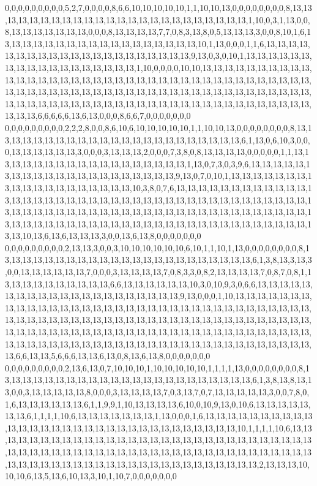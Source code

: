 0,0,0,0,0,0,0,0,0,5,2,7,0,0,0,0,8,6,6,10,10,10,10,10,1,1,10,10,13,0,0,0,0,0,0,0,0,8,13,13,13,13,13,13,13,13,13,13,13,13,13,13,13,13,13,13,13,13,13,13,13,13,1,10,0,3,1,13,0,0,8,13,13,13,13,13,13,13,0,0,0,8,13,13,13,13,7,7,0,8,3,13,8,0,5,13,13,13,3,0,0,8,10,1,6,13,13,13,13,13,13,13,13,13,13,13,13,13,13,13,13,13,13,10,1,13,0,0,0,1,1,6,13,13,13,13,13,13,13,13,13,13,13,13,13,13,13,13,13,13,13,13,13,9,13,0,3,0,10,1,13,13,13,13,13,13,13,13,13,13,13,13,13,13,13,13,13,13,1,10,0,0,0,0,10,10,13,13,13,13,13,13,13,13,13,13,13,13,13,13,13,13,13,13,13,13,13,13,13,13,13,13,13,13,13,13,13,13,13,13,13,13,13,13,13,13,13,13,13,13,13,13,13,13,13,13,13,13,13,13,13,13,13,13,13,13,13,13,13,13,13,13,13,13,13,13,13,13,13,13,13,13,13,13,13,13,13,13,13,13,13,13,13,13,13,13,13,13,13,13,13,13,13,6,6,6,6,6,13,6,13,0,0,0,8,6,6,7,0,0,0,0,0,0,0
0,0,0,0,0,0,0,0,0,2,2,2,8,0,0,8,6,10,6,10,10,10,10,10,1,1,10,10,13,0,0,0,0,0,0,0,0,8,13,13,13,13,13,13,13,13,13,13,13,13,13,13,13,13,13,13,13,13,13,13,13,6,1,13,0,6,10,3,0,0,0,13,13,13,13,13,13,3,0,0,0,3,13,13,13,2,0,0,0,7,3,8,0,8,13,13,13,13,0,0,0,0,0,1,1,13,13,13,13,13,13,13,13,13,13,13,13,13,13,13,13,13,13,1,13,0,7,3,0,3,9,6,13,13,13,13,13,13,13,13,13,13,13,13,13,13,13,13,13,13,13,13,13,9,13,0,7,0,10,1,13,13,13,13,13,13,13,13,13,13,13,13,13,13,13,13,13,13,13,10,3,8,0,7,6,13,13,13,13,13,13,13,13,13,13,13,13,13,13,13,13,13,13,13,13,13,13,13,13,13,13,13,13,13,13,13,13,13,13,13,13,13,13,13,13,13,13,13,13,13,13,13,13,13,13,13,13,13,13,13,13,13,13,13,13,13,13,13,13,13,13,13,13,13,13,13,13,13,13,13,13,13,13,13,13,13,13,13,13,13,13,13,13,13,13,13,13,13,13,13,13,13,13,10,13,6,13,6,13,13,13,3,0,0,13,6,13,8,0,0,0,0,0,0,0
0,0,0,0,0,0,0,0,0,2,13,13,3,0,0,3,10,10,10,10,10,10,6,10,1,1,10,1,13,0,0,0,0,0,0,0,0,8,13,13,13,13,13,13,13,13,13,13,13,13,13,13,13,13,13,13,13,13,13,13,13,6,1,3,8,13,3,13,3,0,0,13,13,13,13,13,13,7,0,0,0,3,13,13,13,13,7,0,8,3,3,0,8,2,13,13,13,13,7,0,8,7,0,8,1,13,13,13,13,13,13,13,13,13,13,6,6,13,13,13,13,13,13,10,3,0,10,9,3,0,6,6,13,13,13,13,13,13,13,13,13,13,13,13,13,13,13,13,13,13,13,13,13,9,13,0,0,0,1,10,13,13,13,13,13,13,13,13,13,13,13,13,13,13,13,13,13,13,13,13,13,13,13,13,13,13,13,13,13,13,13,13,13,13,13,13,13,13,13,13,13,13,13,13,13,13,13,13,13,13,13,13,13,13,13,13,13,13,13,13,13,13,13,13,13,13,13,13,13,13,13,13,13,13,13,13,13,13,13,13,13,13,13,13,13,13,13,13,13,13,13,13,13,13,13,13,13,13,13,13,13,13,13,13,13,13,13,13,13,13,13,13,13,13,13,13,13,13,13,13,6,6,13,13,5,6,6,6,13,13,6,13,0,8,13,6,13,8,0,0,0,0,0,0,0
0,0,0,0,0,0,0,0,0,2,13,6,13,0,7,10,10,10,1,10,10,10,10,10,1,1,1,1,13,0,0,0,0,0,0,0,0,8,13,13,13,13,13,13,13,13,13,13,13,13,13,13,13,13,13,13,13,13,13,13,13,6,1,3,8,13,8,13,13,0,0,3,13,13,13,13,13,8,0,0,0,3,13,13,13,13,7,0,3,13,7,0,7,13,13,13,13,13,3,0,0,7,8,0,1,6,13,13,13,13,13,13,6,1,1,9,9,1,10,13,13,13,13,6,10,0,10,9,13,0,10,6,13,13,13,13,13,13,13,6,1,1,1,1,10,6,13,13,13,13,13,13,13,1,13,0,0,0,1,6,13,13,13,13,13,13,13,13,13,13,13,13,13,13,13,13,13,13,13,13,13,13,13,13,13,13,13,13,13,13,13,10,1,1,1,1,10,6,13,13,13,13,13,13,13,13,13,13,13,13,13,13,13,13,13,13,13,13,13,13,13,13,13,13,13,13,13,13,13,13,13,13,13,13,13,13,13,13,13,13,13,13,13,13,13,13,13,13,13,13,13,13,13,13,13,13,13,13,13,13,13,13,13,13,13,13,13,13,13,13,13,13,13,13,13,13,13,13,13,2,13,13,13,10,10,10,6,13,5,13,6,10,13,3,10,1,10,7,0,0,0,0,0,0,0
